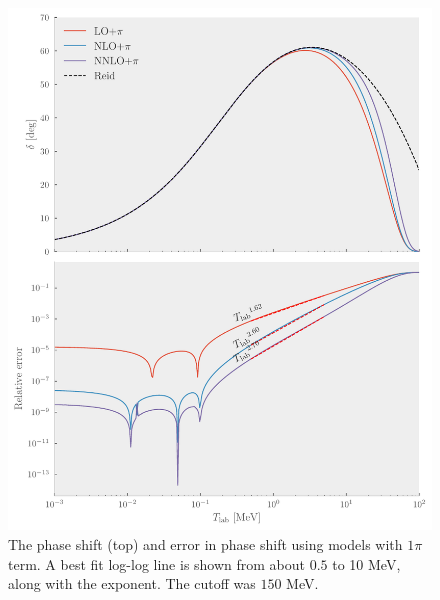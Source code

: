 \begin{figure}[pt]
  \centering
  \includegraphics{Figures/pion_lambda.pdf}
  \caption{\label{fig:pion_lambda}  The phase shift (top) and error in phase
    shift using models with \(1\pi\) term. A best fit log-log line is shown from about \(0.5\) to
    10 MeV, along with the exponent. The cutoff was \(150\) MeV.}
\end{figure}







